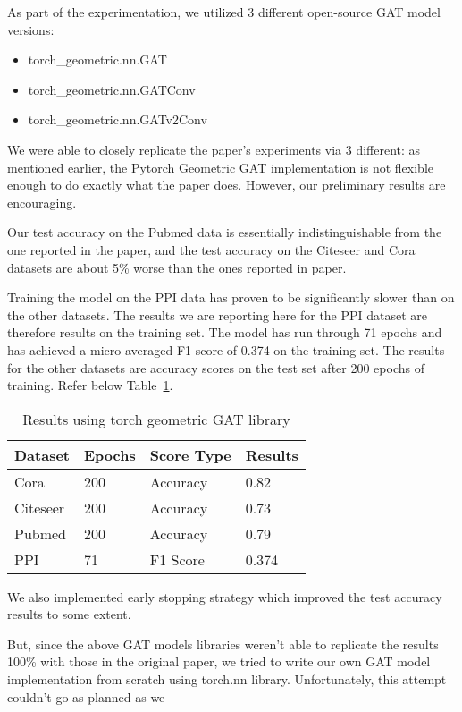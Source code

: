 As part of the experimentation, we utilized 3 different open-source GAT model versions:
\begin{itemize}
    \item torch\_geometric.nn.GAT
    \item torch\_geometric.nn.GATConv
    \item torch\_geometric.nn.GATv2Conv
\end{itemize}

We were able to closely replicate the paper's
experiments via 3 different: as mentioned earlier, the Pytorch Geometric GAT implementation is
not flexible enough to do exactly what the paper does.
However, our preliminary results are encouraging.

Our test accuracy on the Pubmed data is essentially
indistinguishable from the one reported in the paper, and the test accuracy on
the Citeseer and Cora datasets are about 5\% worse than the ones reported in
paper.

Training the model on the PPI data has proven to be significantly slower than on the other datasets.
The results we are reporting here for the PPI dataset are therefore results on the training set.
The model has run through 71 epochs and has achieved a micro-averaged F1 score of 0.374 on the training set.
The results for the other datasets are accuracy scores on the test set after 200 epochs of training.
Refer below Table~\ref{tab:results-table}.

\begin{table}
    \centering
    \begin{tabular}{@{}llll@{}}
        \toprule
        \textbf{Dataset} & \textbf{Epochs} & \textbf{Score Type} & \textbf{Results} \\
        \midrule
        Cora             & 200             & Accuracy            &      {0.82}    \\
        Citeseer         & 200             & Accuracy            &      {0.73}    \\
        Pubmed           & 200             & Accuracy            &      {0.79}    \\
        PPI              & 71              & F1 Score            &      {0.374}   \\
        \bottomrule

    \end{tabular}
    \caption{Results using torch geometric GAT library}
    \label{tab:results-table}
\end{table}

We also implemented early stopping strategy which improved the test accuracy results to some extent.

But, since the above GAT models libraries weren't able to replicate the results 100\% with those in the original paper,
we tried to write our own GAT model implementation from scratch using torch.nn library.
Unfortunately, this attempt couldn't go as planned as we
